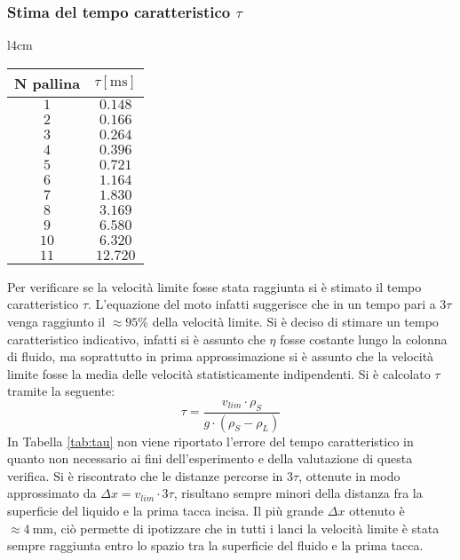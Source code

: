 \documentclass[a4paper,11pt,oneside]{article}
\begin{document}
\subsubsection*{Stima del tempo caratteristico $\tau$}
\begin{wraptable}{l}{4cm}
\centering
    \begin{tabular}{|c|c|}
        \hline
        \textbf{N pallina} & \textbf{$\tau [\si{\milli\second}]$} \\ \hline
        \rowcolor[rgb]{0.85,0.85,0.85}$1$ & $0.148$ \\ \hline
        $2$ & $0.166$ \\ \hline
        \rowcolor[rgb]{0.85,0.85,0.85}$3$ & $0.264$ \\ \hline
        $4$ & $0.396$ \\ \hline
        \rowcolor[rgb]{0.85,0.85,0.85}$5$ & $0.721$ \\ \hline
        $6$ & $1.164$ \\ \hline
        \rowcolor[rgb]{0.85,0.85,0.85}$7$ & $1.830$ \\ \hline
        $8$ & $3.169$ \\ \hline
        \rowcolor[rgb]{0.85,0.85,0.85}$9$ & $6.580$ \\ \hline
        $10$ & $6.320$ \\ \hline
        \rowcolor[rgb]{0.85,0.85,0.85}$11$ & $12.720$ \\ \hline
    \end{tabular}
    \caption{Tempo $\tau$}
    \label{tab:tau}
    \vspace{0.5cm}
\end{wraptable}

Per verificare se la velocità limite fosse stata raggiunta si è stimato il tempo caratteristico $\tau$. L'equazione del moto infatti suggerisce che in un tempo pari a $3\tau$ venga raggiunto il $\approx 95\%$ della velocità limite.
Si è deciso di stimare un tempo caratteristico indicativo, infatti si è assunto che $\eta$ fosse costante lungo la colonna di fluido, ma soprattutto in prima approssimazione si è assunto che la velocità limite fosse la media delle velocità statisticamente indipendenti.
Si è calcolato $\tau$ tramite la seguente:
\begin{equation*}
    \tau = \frac{v_{lim} \cdot \rho_{S}}{g \cdot (\rho_{S} - \rho_{L})}
\end{equation*}
In Tabella \ref{tab:tau} non viene riportato l'errore del tempo caratteristico in quanto non necessario ai fini dell'esperimento e della valutazione di questa verifica. Si è riscontrato che le distanze percorse in $3\tau$, ottenute in modo approssimato da $\Delta x=v_{lim} \cdot 3 \tau$, risultano sempre minori della distanza fra la superficie del liquido e la prima tacca incisa. Il più grande $\Delta x$ ottenuto è $\approx \SI{4}{\milli\metre}$, ciò permette di ipotizzare che in tutti i lanci la velocità limite è stata sempre raggiunta entro lo spazio tra la superficie del fluido e la prima tacca.%
\end{document}
